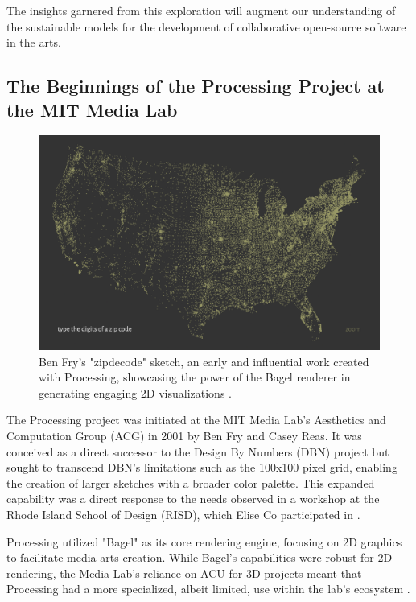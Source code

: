 The insights garnered from this exploration will augment our understanding of the sustainable models for the development of collaborative open-source software in the arts.

\subsection{The Beginnings of the Processing Project at the MIT Media Lab}

\begin{figure}
  \centering
  \includegraphics[width=1\textwidth]{images/2019_zipdecode.png} 
  \caption{Ben Fry's "zipdecode" sketch, an early and influential work created with Processing, showcasing the power of the Bagel renderer in generating engaging 2D visualizations \parencite{fryZipdecode1999}.}
  \label{fig:zipdecode}
\end{figure}

The Processing project was initiated at the MIT Media Lab's Aesthetics and Computation Group (ACG) in 2001 by Ben Fry and Casey Reas. It was conceived as a direct successor to the Design By Numbers (DBN) project but sought to transcend DBN's limitations such as the 100x100 pixel grid, enabling the creation of larger sketches with a broader color palette. This expanded capability was a direct response to the needs observed in a workshop at the Rhode Island School of Design (RISD), which Elise Co participated in \parencite{fryModernPrometheusHistory2018}.

Processing utilized "Bagel" as its core rendering engine, focusing on 2D graphics to facilitate media arts creation. While Bagel's capabilities were robust for 2D rendering, the Media Lab's reliance on ACU for 3D projects meant that Processing had a more specialized, albeit limited, use within the lab's ecosystem \parencite{fryBagel}.


